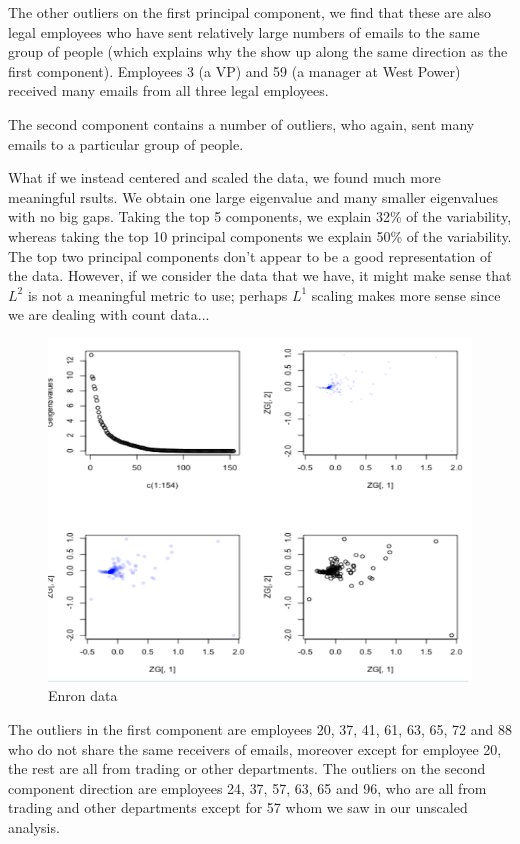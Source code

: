 The other outliers on the first principal component, we find that these are also legal employees who have sent relatively large numbers of emails to the same group of people (which explains why the show up along the same direction as the first component). Employees 3 (a VP) and 59 (a manager at West Power) received many emails from all three legal employees.

The second component contains a number of outliers, who again, sent many emails to a particular group of people.

What if we instead centered and scaled the data, we found much more meaningful rsults. We obtain one large eigenvalue and many smaller eigenvalues with no big gaps. Taking the top 5 components, we explain 32\% of the variability, whereas taking the top 10 principal components we explain 50\% of the variability. The top two principal components don't appear to be a good representation of the data. However, if we consider the data that we have, it might make sense that $L^2$ is not a meaningful metric to use; perhaps $L^1$ scaling makes more sense since we are dealing with count data...

\begin{figure}[H]
\begin{center}
\includegraphics[scale=0.5]{enron2.png}
\end{center}
\caption{Enron data}
\label{fig:enron2}
\end{figure}


The outliers in the first component are employees 20, 37, 41, 61, 63, 65, 72 and 88 who do not share the same receivers of emails, moreover except for employee 20, the rest are all from trading or other departments. The outliers on the second component direction are employees 24, 37, 57, 63, 65 and 96, who are all from trading and other departments except for 57 whom we saw in our unscaled analysis.

